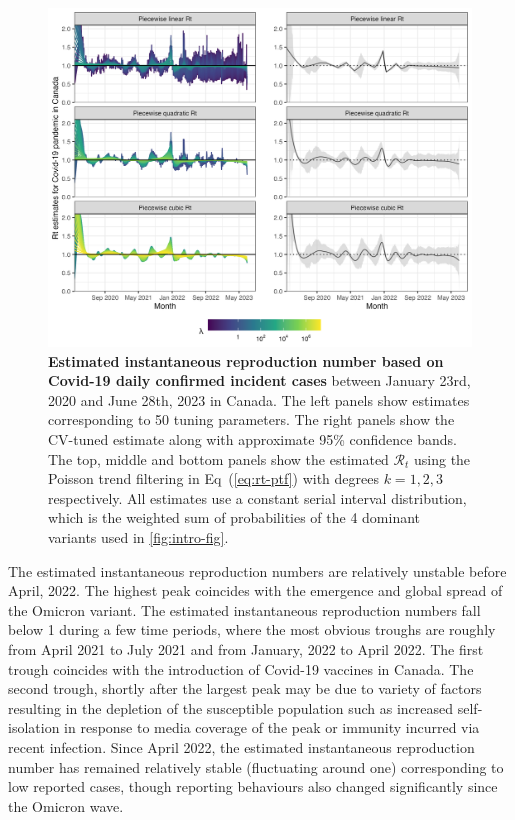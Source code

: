 \documentclass[10pt,letterpaper]{article}
\def\calR{\mathcal{R}}
\renewcommand{\eqref}[1]{Eq~(\ref{#1})}
\begin{document}
\begin{figure}[!t]
  \centering
  \includegraphics[width=1.0\linewidth]{fig/Fig7.png}
  \caption{{\bf Estimated instantaneous reproduction number based on Covid-19 daily
  confirmed incident cases} between January 23rd, 2020 and June 28th, 2023 in
  Canada. The left panels show estimates corresponding to 50 tuning parameters.
  The right panels show the CV-tuned estimate along with approximate 95\%
  confidence bands. The top, middle and bottom panels show the estimated
  $\calR_t$ using the Poisson trend filtering in \eqref{eq:rt-ptf} with degrees
  $k=1,2,3$ respectively. All estimates use a constant serial interval
  distribution, which is the weighted sum of probabilities of the 4 dominant
  variants used in \autoref{fig:intro-fig}.}
  \label{fig:covid-rt}
\end{figure} 

The estimated instantaneous reproduction numbers are relatively unstable before
April, 2022. The highest peak coincides with the emergence and global spread of
the Omicron variant. The estimated instantaneous reproduction numbers fall below
1 during a few time periods, where the most obvious troughs are roughly from
April 2021 to July 2021 and from January, 2022 to April 2022. The first trough
coincides with the introduction of Covid-19 vaccines in Canada. The second
trough, shortly after the largest peak may be due to variety of factors
resulting in the depletion of the susceptible population such as increased
self-isolation in response to media coverage of the peak or immunity incurred
via recent infection. Since April 2022, the estimated instantaneous reproduction
number has remained relatively stable (fluctuating around one) corresponding to
low reported cases, though reporting behaviours also changed significantly since
the Omicron wave. 
\end{document}
